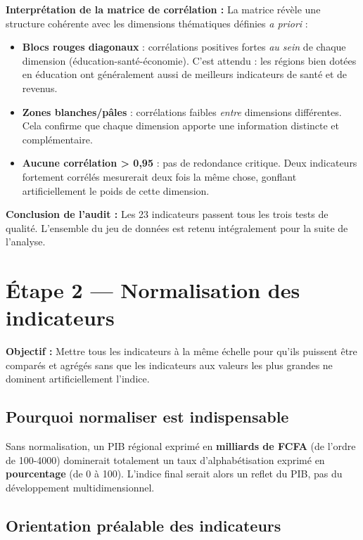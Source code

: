 \documentclass[
]{article}
\providecommand{\tightlist}{%
  \setlength{\itemsep}{0pt}\setlength{\parskip}{0pt}}
\begin{document}
\textbf{Interprétation de la matrice de corrélation :} La matrice révèle
une structure cohérente avec les dimensions thématiques définies \emph{a
priori} :

\begin{itemize}
\tightlist
\item
  \textbf{Blocs rouges diagonaux} : corrélations positives fortes
  \emph{au sein} de chaque dimension (éducation-santé-économie). C'est
  attendu : les régions bien dotées en éducation ont généralement aussi
  de meilleurs indicateurs de santé et de revenus.
\item
  \textbf{Zones blanches/pâles} : corrélations faibles \emph{entre}
  dimensions différentes. Cela confirme que chaque dimension apporte une
  information distincte et complémentaire.
\item
  \textbf{Aucune corrélation \textgreater{} 0,95} : pas de redondance
  critique. Deux indicateurs fortement corrélés mesurerait deux fois la
  même chose, gonflant artificiellement le poids de cette dimension.
\end{itemize}

\textbf{Conclusion de l'audit :} Les 23 indicateurs passent tous les
trois tests de qualité. L'ensemble du jeu de données est retenu
intégralement pour la suite de l'analyse.

\newpage

\section{Étape 2 --- Normalisation des
indicateurs}\label{uxe9tape-2-normalisation-des-indicateurs}

\textbf{Objectif :} Mettre tous les indicateurs à la même échelle pour
qu'ils puissent être comparés et agrégés sans que les indicateurs aux
valeurs les plus grandes ne dominent artificiellement l'indice.

\subsection{Pourquoi normaliser est
indispensable}\label{pourquoi-normaliser-est-indispensable}

Sans normalisation, un PIB régional exprimé en \textbf{milliards de
FCFA} (de l'ordre de 100-4000) dominerait totalement un taux
d'alphabétisation exprimé en \textbf{pourcentage} (de 0 à 100). L'indice
final serait alors un reflet du PIB, pas du développement
multidimensionnel.

\subsection{Orientation préalable des
indicateurs}\label{orientation-pruxe9alable-des-indicateurs}
\end{document}
